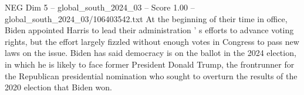 \begin{textsample}{NEG Dim 5 – global\_south\_2024\_03 – Score 1.00 – global\_south\_2024\_03/106403542.txt}
At the beginning of their time in office, Biden appointed Harris to lead their administration ' s efforts to advance voting rights, but the effort largely fizzled without enough votes in Congress to pass new laws on the issue.
Biden has said democracy is on the ballot in the 2024 election, in which he is likely to face former President Donald Trump, the frontrunner for the Republican presidential nomination who sought to overturn the results of the 2020 election that Biden won.

\end{textsample}
